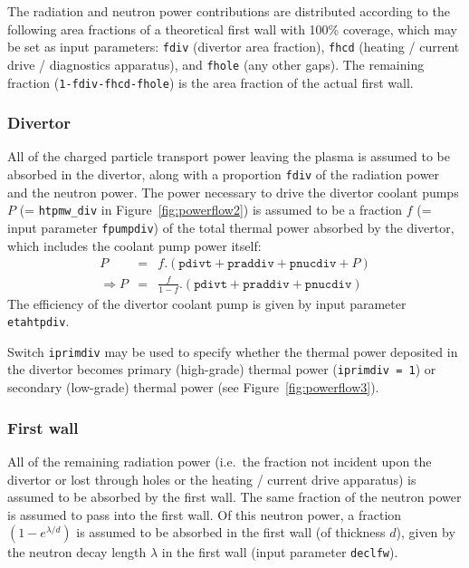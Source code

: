 \documentclass[11pt,a4paper]{report}
\begin{document}
The radiation and neutron power contributions are distributed according to the
following area fractions of a theoretical first wall with 100\% coverage,
which may be set as input parameters: \texttt{fdiv} (divertor area fraction),
\texttt{fhcd} (heating / current drive / diagnostics apparatus), and
\texttt{fhole} (any other gaps). The remaining fraction
(\texttt{1-fdiv-fhcd-fhole}) is the area fraction of the actual first wall.

\subsubsection{Divertor}

All of the charged particle transport power leaving the plasma is assumed to
be absorbed in the divertor, along with a proportion \texttt{fdiv} of the
radiation power and the neutron power. The power necessary to drive the
divertor coolant pumps $P$ (= \texttt{htpmw\_div} in
Figure~\ref{fig:powerflow2}) is assumed to be a fraction $f$ (= input
parameter \texttt{fpumpdiv}) of the total thermal power absorbed by the
divertor, which includes the coolant pump power itself:
\begin{eqnarray*}
P & = & f . (\mathtt{pdivt} + \mathtt{praddiv} + \mathtt{pnucdiv} + P) \\
\Longrightarrow P & = & \frac{f}{1-f} . (\mathtt{pdivt} + \mathtt{praddiv} +
\mathtt{pnucdiv})
\end{eqnarray*}
The efficiency of the divertor coolant pump is given by input parameter
\texttt{etahtpdiv}.

Switch \texttt{iprimdiv} may be used to specify whether the thermal power
deposited in the divertor becomes primary (high-grade) thermal power
(\texttt{iprimdiv = 1}) or secondary (low-grade) thermal power (see
Figure~\ref{fig:powerflow3}).

\subsubsection{First wall}

All of the remaining radiation power (i.e.\ the fraction not incident upon the
divertor or lost through holes or the heating / current drive apparatus) is
assumed to be absorbed by the first wall. The same fraction of the neutron
power is assumed to pass into the first wall. Of this neutron power, a
fraction $(1-e^{\lambda/d})$ is assumed to be absorbed in the first wall
(of thickness $d$), given by the neutron decay length $\lambda$ in the first wall
(input parameter \texttt{declfw}).
\end{document}
